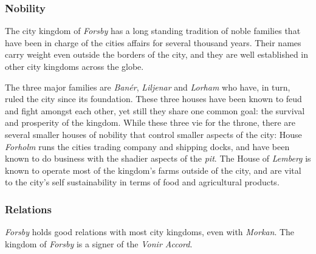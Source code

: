 \subsubsection*{Nobility}

The city kingdom of \emph{Forsby} has a long standing tradition of noble
families that have been in charge of the cities affairs for several thousand
years. Their names carry weight even outside the borders of the city, and
they are well established in other city kingdoms across the globe.

The three major families are \emph{Banér}, \emph{Liljenar} and \emph{Lorham}
who have, in turn, ruled the city since its foundation. These three houses
have been known to feud and fight amongst each other, yet still they share one
common goal: the survival and prosperity of the kingdom. While these three vie
for the throne, there are several smaller houses of nobility that control
smaller aspects of the city: House \emph{Forholm} runs the cities trading
company and shipping docks, and have been known to do business with the
shadier aspects of the \emph{pit}. The House of \emph{Lemberg} is known to
operate most of the kingdom's farms outside of the city, and are vital to the
city's self sustainability in terms of food and agricultural products.

\subsubsection*{Relations}

\emph{Forsby} holds good relations with most city kingdoms, even with
\emph{Morkan}. The kingdom of \emph{Forsby} is a signer of the
\emph{Vonir Accord}.

